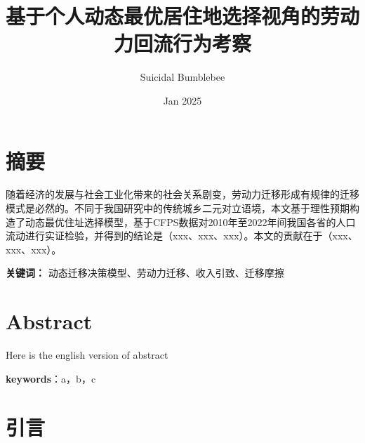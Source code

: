 \documentclass[a4paper,12pt,oneside]{book} %
\title{基于个人动态最优居住地选择视角的劳动力回流行为考察}
\author{Suicidal Bumblebee}
\date{Jan 2025}
\begin{document}
\maketitle

\frontmatter
\chapter{摘要}
随着经济的发展与社会工业化带来的社会关系剧变，劳动力迁移形成有规律的迁移模式是必然的。不同于我国研究中的传统城乡二元对立语境，本文基于理性预期构造了动态最优住址选择模型，基于CFPS数据对2010年至2022年间我国各省的人口流动进行实证检验，并得到的结论是（xxx、xxx、xxx）。本文的贡献在于（xxx、xxx、xxx）。

\textbf{关键词：} 动态迁移决策模型、劳动力迁移、收入引致、迁移摩擦


\chapter{Abstract}

Here is the english version of abstract

\textbf{keywords}：a，b，c

\thispagestyle{empty}
\tableofcontents

\mainmatter
\newpage
\chapter{引言}
\end{document}
